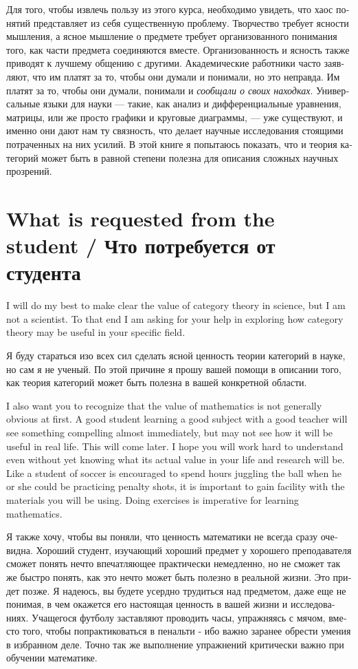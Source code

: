 \documentclass[a4paper]{book}
\theoremstyle{myth}
\begin{document}
\begin{russian}
Для того, чтобы извлечь пользу из этого курса, необходимо увидеть, что хаос понятий представляет из себя существенную проблему. Творчество требует ясности мышления, а ясное мышление о предмете требует организованного понимания того, как части предмета соединяются вместе. Организованность и ясность также приводят к лучшему общению с другими. Академические работники часто заявляют, что им платят за то, чтобы они думали и понимали, но это неправда. Им платят за то, чтобы они думали, понимали и {\em сообщали о своих находках}. Универсальные языки для науки — такие, как анализ и дифференциальные уравнения, матрицы, или же просто графики и круговые диаграммы, — уже существуют, и именно они дают нам ту связность, что делает научные исследования стоящими потраченных на них усилий. В этой книге я попытаюсь показать, что и теория категорий может быть в равной степени полезна для описания сложных научных прозрений. 


\section{What is requested from the student / Что потребуется от студента}

I will do my best to make clear the value of category theory in science, but I am not a scientist. To that end I am asking for your help in exploring how category theory may be useful in your specific field.

Я буду стараться изо всех сил сделать ясной ценность теории категорий в науке, но сам я не ученый. По этой причине я прошу вашей помощи в описании того, как теория категорий может быть полезна в вашей конкретной области. 

I also want you to recognize that the value of mathematics is not generally obvious at first. A good student learning a good subject with a good teacher will see something compelling almost immediately, but may not see how it will be useful in real life. This will come later. I hope you will work hard to understand even without yet knowing what its actual value in your life and research will be. Like a student of soccer is encouraged to spend hours juggling the ball when he or she could be practicing penalty shots, it is important to gain facility with the materials you will be using. Doing exercises is imperative for learning mathematics.

Я также хочу, чтобы вы поняли, что ценность математики не всегда сразу очевидна. Хороший студент, изучающий хороший предмет у хорошего преподавателя сможет понять нечто впечатляющее практически немедленно, но не сможет так же быстро понять, как это нечто может быть полезно в реальной жизни. Это придет позже. Я надеюсь, вы будете усердно трудиться над предметом, даже еще не понимая, в чем окажется его настоящая ценность в вашей жизни и исследованиях. Учащегося футболу заставляют проводить часы, упражняясь с мячом, вместо того, чтобы попрактиковаться в пенальти - ибо важно заранее обрести умения в избранном деле. Точно так же выполнение упражнений критически важно при обучении математике. 


\end{russian}
\end{document}
